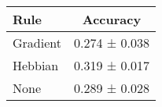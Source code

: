 \begin{tabular}{lc}
\toprule
Rule & Accuracy \\
\midrule
Gradient & 0.274 ± 0.038 \\
Hebbian & 0.319 ± 0.017 \\
None & 0.289 ± 0.028 \\
\bottomrule
\end{tabular}
